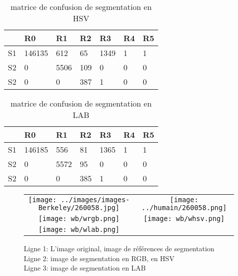 \documentclass[article=a4, fontsize=11pt]{scrartcl}	%
\begin{document}
\begin{table}[!ht]
	\begin{center}
	    \begin{tabular}{| l | l | l | l | l | l | l |}
	    	\hline
	    	  & R0 & R1 & R2 & R3 & R4 & R5\\
	    	\hline
	    	S1 & 146135 & 612 & 65 & 1349 & 1 & 1\\
	    	\hline
	    	S2 & 0 & 5506 & 109 & 0 & 0 & 0\\
	    	\hline
	    	S2 & 0 & 0 & 387 & 1 & 0 & 0\\
	    	\hline	    	
	    \end{tabular}
	\end{center}
	\caption {matrice de confusion de segmentation en HSV}
\end{table}

\begin{table}[!ht]
	\begin{center}
	    \begin{tabular}{| l | l | l | l | l | l | l |}
	    	\hline
	    	  & R0 & R1 & R2 & R3 & R4 & R5\\
	    	\hline
	    	S1 & 146185 & 556 & 81 & 1365 & 1 & 1\\
	    	\hline
	    	S2 & 0 & 5572 & 95 & 0 & 0 & 0\\
	    	\hline
	    	S2 & 0 & 0 & 385 & 1 & 0 & 0\\
	    	\hline	    	
	    \end{tabular}	    
	\end{center}
	\caption {matrice de confusion de segmentation en LAB}
\end{table}
\clearpage
\begin{figure}[!ht]
	\begin{center}
		\begin{tabular}[h]{cc}
			\texttt{[image: ../images/images-Berkeley/260058.jpg]}&
			\texttt{[image: ../humain/260058.png]}\\
						
			\texttt{[image: wb/wrgb.png]}&
			\texttt{[image: wb/whsv.png]}\\
			\texttt{[image: wb/wlab.png]}& 
		\end{tabular}
	\end{center}
	\caption{Ligne 1: L'image original, image de références de segmentation\\
			 Ligne 2: image de segmentation en RGB, en HSV \\
			 Ligne 3: image de segmentation en LAB}	
\end{figure}
\end{document}
